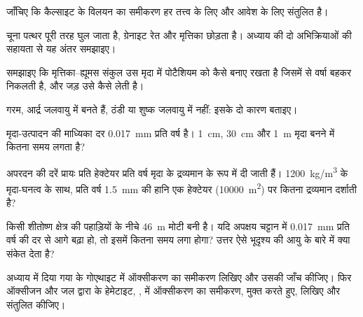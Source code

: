 \begin{exercise}[$\star\star$]\label{exo:g10:soil-formation:6}
जाँचिए कि कैल्साइट के विलयन का समीकरण हर तत्त्व के लिए और आवेश के लिए
संतुलित है।
\end{exercise}

\begin{exercise}[$\star\star$]\label{exo:g10:soil-formation:7}
चूना पत्थर पूरी तरह घुल जाता है, ग्रेनाइट रेत और मृत्तिका छोड़ता है। अध्याय की दो
अभिक्रियाओं की सहायता से यह अंतर समझाइए।
\end{exercise}

\begin{exercise}[$\star\star$]\label{exo:g10:soil-formation:8}
समझाइए कि मृत्तिका--ह्यूमस संकुल उस मृदा में पोटैशियम को कैसे बनाए रखता है जिसमें से वर्षा
बहकर निकलती है, और जड़ उसे कैसे लेती है।
\end{exercise}

\begin{exercise}[$\star\star$]\label{exo:g10:soil-formation:9}
 गरम, आर्द्र जलवायु में बनते हैं, ठंडी या शुष्क जलवायु में नहीं: इसके दो
कारण बताइए।
\end{exercise}

\begin{exercise}[$\star\star$]\label{exo:g10:soil-formation:10}
मृदा-उत्पादन की माध्यिका दर \qty{0.017}{mm} प्रति वर्ष है। \qty{1}{cm},
\qty{30}{cm} और \qty{1}{m} मृदा बनने में कितना समय लगता है?
\end{exercise}

\begin{exercise}[$\star\star$]\label{exo:g10:soil-formation:11}
अपरदन की दरें प्रायः प्रति हेक्टेयर प्रति वर्ष मृदा के द्रव्यमान के रूप में दी जाती हैं।
\qty{1200}{kg/m^3} के मृदा-घनत्व के साथ, प्रति वर्ष \qty{1.5}{mm} की हानि एक हेक्टेयर
(\qty{10000}{m^2}) पर कितना द्रव्यमान दर्शाती है?
\end{exercise}

\begin{exercise}[$\star\star\star$]\label{exo:g10:soil-formation:12}
किसी शीतोष्ण क्षेत्र की पहाड़ियों के नीचे \qty{46}{m} मोटी  बनी है।
यदि अपक्षय चट्टान में \qty{0.017}{mm} प्रति वर्ष की दर से आगे बढ़ा हो, तो इसमें कितना
समय लगा होगा? उत्तर ऐसे भूदृश्य की आयु के बारे में क्या संकेत
देता है?
\end{exercise}

\begin{exercise}[$\star\star\star$]\label{exo:g10:soil-formation:13}
अध्याय में दिया गया  के गोएथाइट में ऑक्सीकरण का समीकरण लिखिए
और उसकी जाँच कीजिए। फिर ऑक्सीजन और जल द्वारा  के
हेमेटाइट, , में ऑक्सीकरण का समीकरण,  मुक्त करते हुए, लिखिए और संतुलित कीजिए।
\end{exercise}

